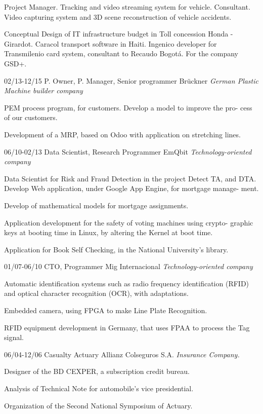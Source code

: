 \begin{entrylist}
  \entry
	{}
  {}
  {}
  {
Project Manager. Tracking and video streaming system for vehicle. Consultant. Video capturing system and 3D scene reconstruction of vehicle accidents.

Conceptual Design of IT infrastructure budget in Toll concession Honda - Girardot. Caracol transport software in Haiti. Ingenico developer for Transmilenio card system, consultant to Recaudo Bogotá. For the company GSD+.}

  \entry
	{02/13-12/15}
	{P. Owner, P. Manager, Senior programmer}
	{Brückner {\sl German Plastic Machine builder company}}
	{PEM process program, for customers. Develop a model to improve the pro-
cess of our customers.

	Development of a MRP, based on Odoo with application on stretching lines.}


  \entry
	{06/10-02/13}
	{Data Scientist, Research Programmer}
	{EmQbit {\sl Technology-oriented company}}
	{Data Scientist for Risk and Fraud Detection in the project Detect TA, and DTA.
Develop Web application, under Google App Engine, for mortgage manage-
ment.

Develop of mathematical models for mortgage assignments.

Application development for the safety of voting machines using crypto-
graphic keys at booting time in Linux, by altering the Kernel at boot time.

	Application for Book Self Checking, in the National University’s library.}
  \entry
	{01/07-06/10}
	{CTO, Programmer}
	{Mig Internacional {\sl Technology-oriented company}}
	{Automatic identification systems such as radio frequency identification (RFID)
and optical character recognition (OCR), with adaptations.

Embedded camera, using FPGA to make Line Plate Recognition.

RFID equipment development in Germany, that uses FPAA to process the
	Tag signal.}

  \entry
	{06/04-12/06}
	{Casualty Actuary}
	{Allianz Colseguros S.A. {\sl Insurance Company.}}
	{Designer of the BD CEXPER, a subscription credit bureau.

Analysis of Technical Note for automobile’s vice presidential.

Organization of the Second National Symposium of Actuary.

}
\end{entrylist}
